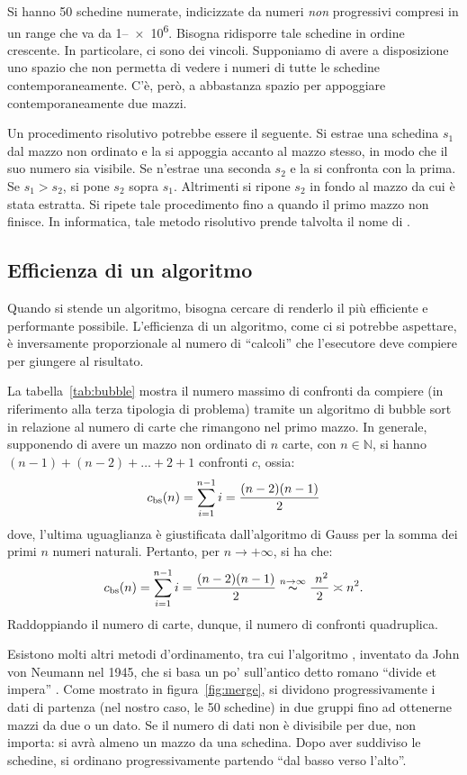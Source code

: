 Si hanno \num{50} schedine numerate, indicizzate da numeri \emph{non} progressivi compresi in un range che va da \numrange{1}{e6}. Bisogna ridisporre tale schedine in ordine crescente. In particolare, ci sono dei vincoli. Supponiamo di avere a disposizione uno spazio che non permetta di vedere i numeri di tutte le schedine contemporaneamente. C'è, però, a abbastanza spazio per appoggiare contemporaneamente due mazzi.

Un procedimento risolutivo potrebbe essere il seguente. Si estrae una schedina $s_1$ dal mazzo non ordinato e la si appoggia accanto al mazzo stesso, in modo che il suo numero sia visibile. Se n'estrae una seconda $s_2$ e la si confronta con la prima. Se $s_1>s_2$, si pone $s_2$ sopra $s_1$. Altrimenti si ripone $s_2$ in fondo al mazzo da cui è stata estratta. Si ripete tale procedimento fino a quando il primo mazzo non finisce. In informatica, tale metodo risolutivo prende talvolta il nome di .



		\subsection{Efficienza di un algoritmo}
		\label{subsec:eff}
Quando si stende un algoritmo, bisogna cercare di renderlo il più efficiente e performante possibile.
L'efficienza di un algoritmo, come ci si potrebbe aspettare, è inversamente proporzionale al numero di ``calcoli'' che l'esecutore deve compiere per giungere al risultato. 

La  tabella~\vref{tab:bubble} mostra il numero massimo di confronti da compiere (in riferimento alla terza tipologia di problema) tramite un algoritmo di bubble sort in relazione al numero di carte che rimangono nel primo mazzo. In generale, supponendo di avere un mazzo non ordinato di $n$ carte, con $n\in\mathbb{N}$, si hanno $(n-1)+(n-2)+\dots+2+1$ confronti $c$, ossia:
\[
c_\textup{bs}(n)=\sum_{i=1}^{n-1}i=\frac{(n-2)(n-1)}{2}
\]
dove, l'ultima uguaglianza è giustificata dall'algoritmo di Gauss per la somma dei primi $n$ numeri naturali. Pertanto, per $n\to+\infty$, si ha che:
\[
c_\textup{bs}(n)
= \sum_{i=1}^{n-1}i=\frac{(n-2)(n-1)}{2}
\overset{n\to\infty}{\thicksim}
\frac{\ n^2}{2}\asymp n^{2}.
\]
Raddoppiando il numero di carte, dunque, il numero di confronti quadruplica.

Esistono  molti altri metodi d'ordinamento, tra cui l'algoritmo , inventato da John von Neumann nel 1945, che si basa un po' sull'antico detto romano ``divide et impera'' \parencite{wiki:it}.
Come mostrato in figura~\ref{fig:merge}, si dividono progressivamente i dati di partenza (nel nostro caso, le \num{50} schedine) in due gruppi fino ad ottenerne mazzi da due o un dato.
Se il numero di dati non è divisibile per due, non importa: si avrà almeno un mazzo da una schedina.
Dopo aver suddiviso le schedine, si ordinano progressivamente partendo ``dal basso verso l'alto''.

